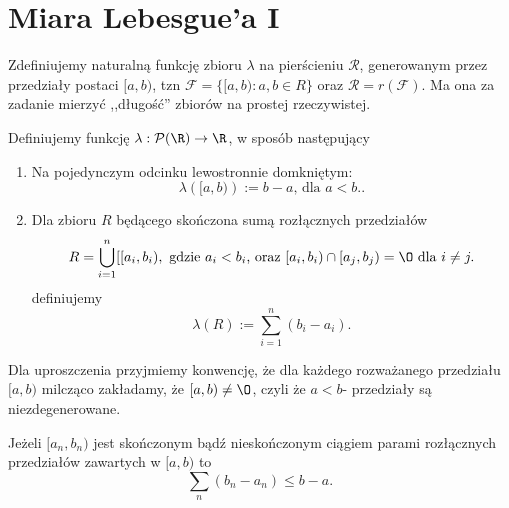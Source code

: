 \section{Miara Lebesgue'a I}

Zdefiniujemy naturalną funkcję zbioru $\lambda$	na pierścieniu $\mathcal{R}$, generowanym przez przedziały postaci $[a,b)$, tzn  $\mathcal{F} = \{[a,b): a,b \in R\} $ oraz $\mathcal{R} = r\left( \mathcal{F} \right) $. Ma ona za zadanie mierzyć ,,długość'' zbiorów na prostej rzeczywistej. 

\begin{definition}
	
	Definiujemy funkcję $\lambda: \mathcal{P}(\R) \to \R$, w sposób następujący
	\begin{enumerate}[label=\alph*)]
		\item Na pojedynczym odcinku lewostronnie domkniętym:
			\[
			\lambda\left( [a,b) \right) := b-a \text{, dla } a<b.
			.\] 
		\item Dla zbioru $R$ będącego skończona sumą rozłącznych przedziałów 
	\[
	R = \bigcup_{i=1} ^{n}[[a_{i}, b_{i}), \text{ gdzie }a_{i}<b_{i}\text{, oraz } [a_{i},b_{i}) \cap [a_{j}, b_{j}) = \O\text{ dla }i\neq j
	.\] 
	definiujemy
	\[
	\lambda\left( R \right) := \sum_{i=1}^{n} (b_{i}-a_{i})
	.\]
	\end{enumerate} 
\end{definition} 
Dla uproszczenia przyjmiemy konwencję, że dla każdego rozważanego przedziału $[a,b) $ milcząco zakładamy, że $[a,b)\neq \O$, czyli że $a<b$- przedziały są niezdegenerowane.

 \begin{lemma}
	Jeżeli $[a_{n},b_{n}) $ jest skończonym bądź nieskończonym ciągiem parami rozłącznych przedziałów zawartych w $[a,b)$ to
	 \[
	\sum_{n} (b_{n}-a_{n}) \le b-a
	.\] 
\end{lemma} 

\vspace{1em}

